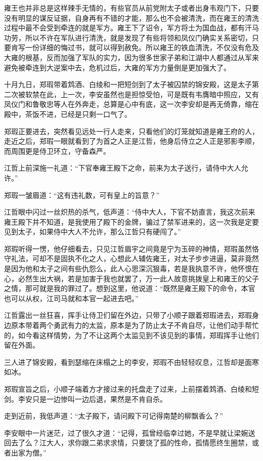 雍王也并非总是这样辣手无情的，有些官员从前党附太子或者出身韦观门下，只要没有明显的谋反证据，自身再有不错的才能，那么也不会被清洗，而在雍王的清洗过程中最不会受到牵连的就是军方。雍王下了诏令，军方将士为国血战，都有汗马功劳，所以不许在军队进行清洗，就是发现了有些将领和凤仪门确实关系密切，只要肯写一份详细的悔过书，就可以得到赦免。所以雍王的铁血清洗，不仅没有危及大雍的根基，反而加强了军队的实力，因为很多世家子弟和江湖中人都通过从军来避免被牵连到大逆案中去，危机过后，大雍的军方力量倒是更加强大了。

十月九日，郑瑕带着鸩酒、白绫和一把短剑到了太子被囚禁的锦安殿，这是太子第二次被软禁在此，上一次，李安虽然也是担惊受怕，可是既有韦膺暗中照应，又有凤仪门和鲁敬忠等人在外奔走，总算是心中有底，这一次李安却是再无倚靠，缩在殿中，茶饭不进，已经是只剩一口气了。

郑瑕正要进去，突然看见远处一行人走来，只看他们的灯笼就知道是雍王府的人，走近之后，郑瑕一眼就看到了为首之人正是江哲，他身后侍立之人正是邪影李顺，而周围更是侍卫环立，守备森严。

江哲上前深施一礼道：“下官奉雍王殿下之命，前来为太子送行，请侍中大人允许。”

郑瑕一皱眉道：“这有违礼数，可有皇上的旨意？”

江哲眼中闪过一丝炽热的杀气，低声道：“侍中大人，下官不妨直言，我这次前来雍王殿下并不知道，是我使用了殿下的金牌，骗过了禁军进来的，这一次我是定要见到太子，如果侍中大人不允许，那么江哲只有硬闯了。”

郑瑕听得一愣，他仔细看去，只见江哲眉宇之间竟是宁为玉碎的神情，郑瑕虽然恪守礼法，可却不是固执不化之人，心想此人辅佐雍王，对太子步步进逼，莫非竟然是因为他和太子之间有些仇怨么，此人心思深沉狠毒，若是我执意不许，他怀恨在心，必然生出大祸，若是加害于我也就罢了，万一此人故意挑拨皇上和雍王的父子之情，那可就是我的罪过了。想到这里，他说道：“既然是雍王殿下的命令，本官也可以从权，江司马就和本官一起进去吧。”

江哲露出一丝狂喜，挥手让侍卫们留在外边，只带了小顺子跟着郑瑕进去，郑瑕身边原本带着两个勇武有力的太监，原本是为了防止太子不肯自尽，让他们动手帮忙的，如今看这样情势，为了不让这两个太监见到不该见到的事情，郑瑕挥手让他们留在外面。

三人进了锦安殿，看到瑟缩在床榻之上的李安，郑瑕不由轻轻叹息，江哲却是面寒如冰。

郑瑕宣旨之后，小顺子端着方才接过来的托盘走了过来，上前摆着鸩酒、白绫和短剑。李安只是一边惨叫一边后退，果然是不肯自杀。

走到近前，我低声道：“太子殿下，请问殿下可记得南楚的柳飘香么？”

李安眼中一片迷茫，过了很久才道：“记得，孤曾经临幸过她，不是早就让梁婉送回去了么？江大人，求你跟二弟求求情，只要饶了孤的性命，孤情愿终生圈禁，或者出家为僧。”

